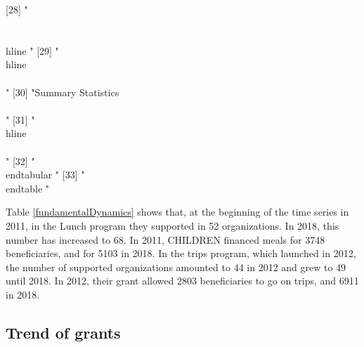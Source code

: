 \documentclass[12pt, a4paper, titlepage]{article}\usepackage[]{graphicx}\usepackage[]{color}
\begin{document}
[28] "\\\\[-1.8ex]\\hline "                                                                                       
[29] "\\hline \\\\[-1.8ex] "                                                                                      
[30] "Summary Statistics \\\\ "                                                                                   
[31] "\\hline \\\\[-1.8ex] "                                                                                      
[32] "\\end{tabular} "                                                                                            
[33] "\\end{table} "                                                                                              



Table \ref{fundamentalDynamics} shows that, at the beginning of the time series in 2011, in the Lunch program they supported in 52 organizations. In 2018, this number has increased to 68. In 2011, CHILDREN financed meals for 3748 beneficiaries, and for 5103 in 2018. In the trips program, which launched in 2012, the number of supported organizations amounted to 44 in 2012 and grew to 49 until 2018. In 2012, their grant allowed 2803 beneficiaries to go on trips, and 6911 in 2018.

\subsection{Trend of grants} 
\end{document}
